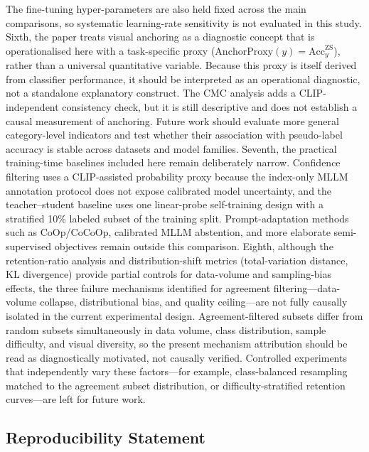 \documentclass{ieeeaccess}
\begin{document}
The fine-tuning hyper-parameters are also held fixed across the main
comparisons, so systematic learning-rate sensitivity is not evaluated
in this study.
Sixth, the paper treats visual anchoring as a
diagnostic concept that is operationalised here with a task-specific
proxy ($\mathrm{AnchorProxy}(y)=\mathrm{Acc}^{\mathrm{ZS}}_{y}$), rather
than a universal quantitative variable.
Because this proxy is itself derived from classifier performance, it
should be interpreted as an operational diagnostic, not a
standalone explanatory construct.
The CMC analysis adds a CLIP-independent consistency check, but it is
still descriptive and does not establish a causal measurement of
anchoring.
Future work should evaluate more general category-level indicators and
test whether their association with pseudo-label accuracy is stable
across datasets and model families.
Seventh, the practical training-time baselines included here remain
deliberately narrow. Confidence filtering uses a CLIP-assisted
probability proxy because the index-only MLLM annotation protocol does
not expose calibrated model uncertainty, and the teacher--student
baseline uses one linear-probe self-training design with a stratified
10\% labeled subset of the training split.
Prompt-adaptation methods such as CoOp/CoCoOp, calibrated MLLM
abstention, and more elaborate semi-supervised objectives remain
outside this comparison.
Eighth, although the retention-ratio analysis and distribution-shift
metrics (total-variation distance, KL divergence) provide partial
controls for data-volume and sampling-bias effects, the three failure
mechanisms identified for agreement filtering---data-volume collapse,
distributional bias, and quality ceiling---are not fully causally
isolated in the current experimental design. Agreement-filtered
subsets differ from random subsets simultaneously in data volume,
class distribution, sample difficulty, and visual diversity, so the
present mechanism attribution should be read as diagnostically
motivated, not causally verified. Controlled experiments that
independently vary these factors---for example, class-balanced
resampling matched to the agreement subset distribution, or
difficulty-stratified retention curves---are left for future work.

\subsection{Reproducibility Statement}
\label{sec:repro}
\end{document}
